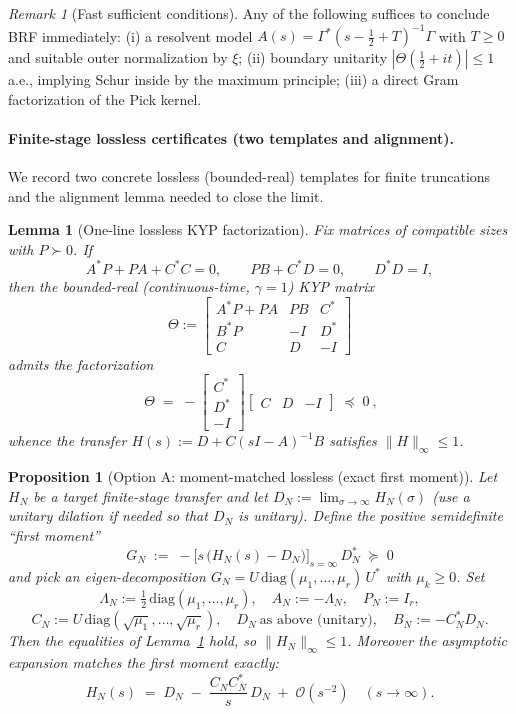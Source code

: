 \documentclass[11pt]{article}
\newtheorem{proposition}[theorem]{Proposition}
\newtheorem{lemma}[theorem]{Lemma}
\theoremstyle{remark}
\newtheorem{remark}[theorem]{Remark}
\begin{document}
\begin{remark}[Fast sufficient conditions]
Any of the following suffices to conclude BRF immediately: (i) a resolvent model $A(s)=\Gamma^*(s-\tfrac12+T)^{-1}\Gamma$ with $T\ge 0$ and suitable outer normalization by $\xi$; (ii) boundary unitarity $|\Theta(\tfrac12+it)|\le 1$ a.e., implying Schur inside by the maximum principle; (iii) a direct Gram factorization of the Pick kernel.
\end{remark}

\paragraph{Finite-stage lossless certificates (two templates and alignment).}
We record two concrete lossless (bounded-real) templates for finite truncations and the alignment lemma needed to close the limit.

\begin{lemma}[One-line lossless KYP factorization]\label{lem:lossless-KYP}
Fix matrices of compatible sizes with $P\succ 0$. If
\[
 A^*P+PA+C^*C=0,\qquad PB+C^*D=0,\qquad D^*D=I,
\]
then the bounded-real (continuous-time, $\gamma=1$) KYP matrix
\[
 \Theta:=\begin{bmatrix}
 A^*P+PA & PB & C^*\\
 B^*P & -I & D^*\\
 C & D & -I
 \end{bmatrix}
\]
admits the factorization
\[
 \boxed{\ \Theta\;=\;-\begin{bmatrix}C^*\\ D^*\\ -I\end{bmatrix}\!\begin{bmatrix}C & D & -I\end{bmatrix}\;\preceq\;0\ },
\]
whence the transfer $H(s):=D+C(sI-A)^{-1}B$ satisfies $\|H\|_\infty\le 1$.\qedhere
\end{lemma}

\begin{proposition}[Option A: moment-matched lossless (exact first moment)]\label{prop:moment-matched}
Let $H_N$ be a target finite-stage transfer and let $D_N:=\lim_{\sigma\to\infty}H_N(\sigma)$ (use a unitary dilation if needed so that $D_N$ is unitary). Define the positive semidefinite ``first moment''
\[
 G_N\;:=\;-\Big[s\,\big(H_N(s)-D_N\big)\Big]_{s=\infty}\,D_N^*\;\succeq\;0
\]
and pick an eigen-decomposition $G_N=U\,\mathrm{diag}(\mu_1,\dots,\mu_r)\,U^*$ with $\mu_k\ge 0$. Set
\[
 \Lambda_N:=\tfrac12\,\mathrm{diag}(\mu_1,\dots,\mu_r),\quad A_N:=-\Lambda_N,\quad P_N:=I_r,
\]
\[
 C_N:=U\,\mathrm{diag}(\sqrt{\mu_1},\dots,\sqrt{\mu_r}),\quad D_N\ \text{as above (unitary)},\quad B_N:=-C_N^*D_N.
\]
Then the equalities of Lemma~\ref{lem:lossless-KYP} hold, so $\|H_N\|_\infty\le 1$. Moreover the asymptotic expansion matches the first moment exactly:
\[
 H_N(s)\;=\;D_N\; -\; \frac{C_NC_N^*}{s}\,D_N\; +\; \mathcal O(s^{-2})\quad(s\to\infty).
\]
\end{proposition}
\end{document}

